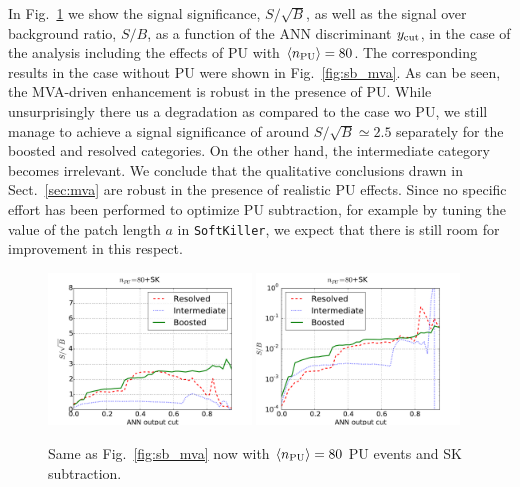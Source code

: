 In Fig.~\ref{fig:sb_mva_PU} we show the signal significance,
$S/\sqrt{B}$, as well as the signal over background ratio,
$S/B$, as a function of the ANN discriminant $y_{\rm cut}$, in the case
of the analysis including the effects of PU
with $\left\langle n_{\rm PU}\right\rangle=80$.
%
The corresponding results in the case without PU were shown in
Fig.~\ref{fig:sb_mva}.
%
As can be seen, the MVA-driven enhancement is robust in the
presence of PU.
%
While unsurprisingly there us a degradation as compared to the case wo PU,
we still manage to achieve a signal significance of
around $S/\sqrt{B}\simeq 2.5$ separately for the boosted and resolved
categories.
%
On the other hand, the intermediate category becomes irrelevant.
%
We conclude that the qualitative conclusions drawn in
Sect.~\ref{sec:mva} are robust in the presence
of realistic PU effects.
%
Since no specific effort has been performed to
optimize PU subtraction, for example by tuning the value
of the patch length $a$ in {\tt SoftKiller}, we expect that
there is
still room for improvement in this respect.


\begin{figure}[t]
\begin{center}
\includegraphics[width=0.48\textwidth]{plots/ssb_SKPU80.pdf}
\includegraphics[width=0.48\textwidth]{plots/sb_SKPU80.pdf}
\caption{\small Same as Fig.~\ref{fig:sb_mva}
  now
  with  $\left\langle n_{\rm PU}\right\rangle=80$ PU events 
  and SK subtraction.
}
\label{fig:sb_mva_PU}
\end{center}
\end{figure}

